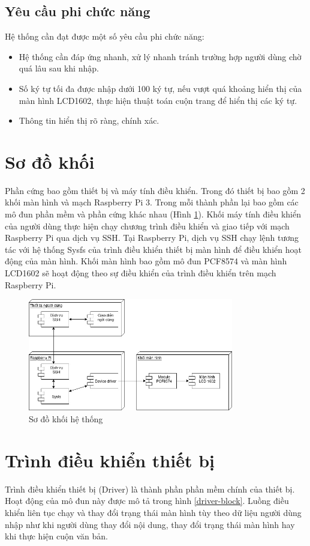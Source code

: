 \documentclass{report}
\begin{document}
\subsection{Yêu cầu phi chức năng}
Hệ thống cần đạt được một số yêu cầu phi chức năng:

\begin{itemize}
	\item Hệ thống cần đáp ứng nhanh, xử lý nhanh tránh trường hợp người dùng chờ quá lâu sau khi nhập.
	\item Số ký tự tối đa được nhập dưới 100 ký tự, nếu vượt quá khoảng hiển thị của màn hình LCD1602, thực hiện thuật toán cuộn trang để hiển thị các ký tự.
	\item Thông tin hiển thị rõ ràng, chính xác.
\end{itemize}
\section{Sơ đồ khối}
Phần cứng bao gồm thiết bị và máy tính điều khiển. Trong đó thiết bị bao gồm 2 khối màn hình và mạch Raspberry Pi 3. Trong mỗi thành phần lại bao gồm các mô đun phần mềm và phần cứng khác nhau (Hình \ref{block-diagram}). Khối máy tính điều khiển của người dùng thực hiện chạy chương trình điều khiển và giao tiếp với mạch Raspberry Pi qua dịch vụ SSH. Tại Raspberry Pi, dịch vụ SSH chạy lệnh tương tác với hệ thống Sysfs của trình điều khiển thiết bị màn hình để điều khiển hoạt động của màn hình. Khối màn hình bao gồm mô đun PCF8574 và màn hình LCD1602 sẽ hoạt động theo sự điều khiển của trình điều khiển trên mạch Raspberry Pi.

\begin{figure}[H]
	\centering
	\includegraphics[width=0.8\textwidth]{../images/linux-component.jpg}
	\caption{Sơ đồ khối hệ thống}
	\label{block-diagram}
\end{figure}
\section{Trình điều khiển thiết bị}
Trình điều khiển thiết bị (Driver) là thành phần phần mềm chính của thiết bị. Hoạt động của mô đun này được mô tả trong hình \ref{driver-block}. Luồng điều khiển liên tục chạy và thay đổi trạng thái màn hình tùy theo dữ liệu người dùng nhập như khi người dùng thay đổi nội dung, thay đổi trạng thái màn hình hay khi thực hiện cuộn văn bản.
\end{document}
